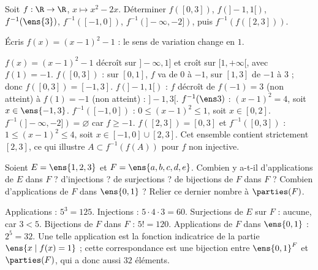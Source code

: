 \begin{exo}
Soit $f:\R\to\R$, $x\mapsto x^2-2x$. Déterminer $f([0,3])$, $f(]-1,1[)$, $f^{-1}(\ens{3})$, $f^{-1}([-1,0])$, $f^{-1}(]-\infty,-2])$, puis $f^{-1}(f([2,3]))$.
\begin{indication}
Écris $f(x)=(x-1)^2-1$ : le sens de variation change en $1$.
\end{indication}
\begin{corrige}
$f(x)=(x-1)^2-1$ décroît sur $]-\infty,1]$ et croît sur $[1,+\infty[$, avec $f(1)=-1$.
$f([0,3])$ : sur $[0,1]$, $f$ va de $0$ à $-1$, sur $[1,3]$ de $-1$ à $3$ ; donc $f([0,3])=[-1,3]$.
$f(]-1,1[)$ : $f$ décroît de $f(-1)=3$ (non atteint) à $f(1)=-1$ (non atteint) : $]-1,3[$.
$f^{-1}(\ens3)$ : $(x-1)^2=4$, soit $x\in\ens{-1,3}$.
$f^{-1}([-1,0])$ : $0\le(x-1)^2\le1$, soit $x\in[0,2]$.
$f^{-1}(]-\infty,-2])=\varnothing$ car $f\ge-1$.
$f([2,3])=[0,3]$ et $f^{-1}([0,3])$ : $1\le(x-1)^2\le4$, soit $x\in[-1,0]\cup[2,3]$. Cet ensemble contient strictement $[2,3]$, ce qui illustre $A\subset f^{-1}(f(A))$ pour $f$ non injective.
\end{corrige}
\end{exo}
\begin{exo}
Soient $E=\ens{1,2,3}$ et $F=\ens{a,b,c,d,e}$. Combien y a-t-il d'applications de $E$ dans $F$ ? d'injections ? de surjections ? de bijections de $F$ dans $F$ ? Combien d'applications de $F$ dans $\ens{0,1}$ ? Relier ce dernier nombre à $\parties(F)$.
\begin{corrige}
Applications : $5^3=125$. Injections : $5\cdot4\cdot3=60$. Surjections de $E$ sur $F$ : aucune, car $3<5$. Bijections de $F$ dans $F$ : $5!=120$. Applications de $F$ dans $\ens{0,1}$ : $2^5=32$. Une telle application est la fonction indicatrice de la partie $\ens{x\mid f(x)=1}$ ; cette correspondance est une bijection entre $\ens{0,1}^F$ et $\parties(F)$, qui a donc aussi $32$ éléments.
\end{corrige}
\end{exo}
